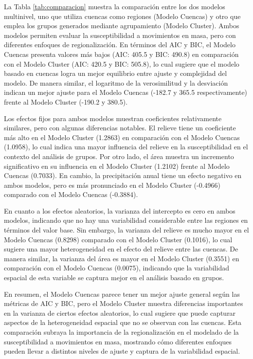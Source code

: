 \documentclass[
  manuscript=article,  
  layout=preprint,  
]{format}
\begin{document}
La Tabla \ref{tab:comparacion} muestra la comparación entre los dos modelos multinivel, uno que utiliza cuencas como regiones (Modelo Cuencas) y otro que emplea los grupos generados mediante agrupamiento (Modelo Cluster). Ambos modelos permiten evaluar la susceptibilidad a movimientos en masa, pero con diferentes enfoques de regionalización. En términos del AIC y BIC, el Modelo Cuencas presenta valores más bajos (AIC: 405.5 y BIC: 490.8) en comparación con el Modelo Cluster (AIC: 420.5 y BIC: 505.8), lo cual sugiere que el modelo basado en cuencas logra un mejor equilibrio entre ajuste y complejidad del modelo. De manera similar, el logaritmo de la verosimilitud y la desviación indican un mejor ajuste para el Modelo Cuencas (-182.7 y 365.5 respectivamente) frente al Modelo Cluster (-190.2 y 380.5).

Los efectos fijos para ambos modelos muestran coeficientes relativamente similares, pero con algunas diferencias notables. El relieve tiene un coeficiente más alto en el Modelo Cluster (1.2863) en comparación con el Modelo Cuencas (1.0958), lo cual indica una mayor influencia del relieve en la susceptibilidad en el contexto del análisis de grupos. Por otro lado, el área muestra un incremento significativo en su influencia en el Modelo Cluster (1.2102) frente al Modelo Cuencas (0.7033). En cambio, la precipitación anual tiene un efecto negativo en ambos modelos, pero es más pronunciado en el Modelo Cluster (-0.4966) comparado con el Modelo Cuencas (-0.3884).

En cuanto a los efectos aleatorios, la varianza del intercepto es cero en ambos modelos, indicando que no hay una variabilidad considerable entre las regiones en términos del valor base. Sin embargo, la varianza del relieve es mucho mayor en el Modelo Cuencas (0.8298) comparado con el Modelo Cluster (0.1016), lo cual sugiere una mayor heterogeneidad en el efecto del relieve entre las cuencas. De manera similar, la varianza del área es mayor en el Modelo Cluster (0.3551) en comparación con el Modelo Cuencas (0.0075), indicando que la variabilidad espacial de esta variable se captura mejor en el análisis basado en grupos.

En resumen, el Modelo Cuencas parece tener un mejor ajuste general según las métricas de AIC y BIC, pero el Modelo Cluster muestra diferencias importantes en la varianza de ciertos efectos aleatorios, lo cual sugiere que puede capturar aspectos de la heterogeneidad espacial que no se observan con las cuencas. Esta comparación subraya la importancia de la regionalización en el modelado de la susceptibilidad a movimientos en masa, mostrando cómo diferentes enfoques pueden llevar a distintos niveles de ajuste y captura de la variabilidad espacial.
\end{document}
